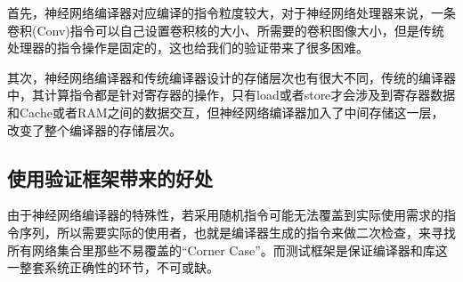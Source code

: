 首先，神经网络编译器对应编译的指令粒度较大，对于神经网络处理器来说，一条卷积(Conv)指令可以自己设置卷积核的大小、所需要的卷积图像大小，但是传统处理器的指令操作是固定的，这也给我们的验证带来了很多困难。

其次，神经网络编译器和传统编译器设计的存储层次也有很大不同，传统的编译器中，其计算指令都是针对寄存器的操作，只有load或者store才会涉及到寄存器数据和Cache或者RAM之间的数据交互，但神经网络编译器加入了中间存储这一层，改变了整个编译器的存储层次。

\subsection{使用验证框架带来的好处}
由于神经网络编译器的特殊性，若采用随机指令可能无法覆盖到实际使用需求的指令序列，所以需要实际的使用者，也就是编译器生成的指令来做二次检查，来寻找所有网络集合里那些不易覆盖的“Corner Case”。而测试框架是保证编译器和库这一整套系统正确性的环节，不可或缺。